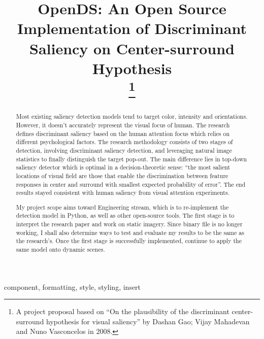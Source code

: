 \documentclass[conference]{IEEEtran}
\begin{document}
\title{OpenDS: An Open Source Implementation of Discriminant Saliency on Center-surround Hypothesis\\
\thanks{A project proposal based on “On the plausibility of the discriminant center-surround hypothesis for visual saliency” by Dashan Gao; Vijay Mahadevan and Nuno Vasconcelos in 2008.}
}

\author{
}

\maketitle

\begin{abstract}
Most existing saliency detection models tend to target color, intensity and orientations. However, it doesn’t accurately represent the visual focus of human. The research defines discriminant saliency based on the human attention focus which relies on different psychological factors. The research methodology consists of two stages of detection, involving discriminant saliency detection, and leveraging natural image statistics to finally distinguish the target pop-out. The main difference lies in top-down saliency detector which is optimal in a decision-theoretic sense: “the most salient locations of visual field are those that enable the discrimination between feature responses in center and surround with smallest expected probability of error”. The end results stayed consistent with human saliency from visual attention experiments.  
 
My project scope aims toward Engineering stream, which is to re-implement the detection model in Python, as well as other open-source tools. The first stage is to interpret the research paper and work on static imagery. Since binary file is no longer working, I shall also determine ways to test and evaluate my results to be the same as the research’s. Once the first stage is successfully implemented, continue to apply the same model onto dynamic scenes.

\end{abstract}

\begin{IEEEkeywords}
component, formatting, style, styling, insert
\end{IEEEkeywords}
\end{document}
